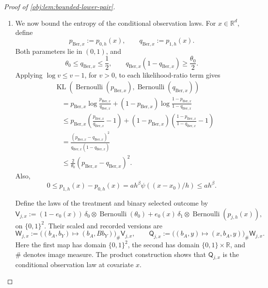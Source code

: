 \documentclass[11pt]{article}
\begin{document}
\begin{proof}[Proof of \cref{obj:lem:bounded-lower-pair}]
\begin{enumerate}
\item We now bound the entropy of the conditional observation laws.
For \(x\in\mathbb R^d\), define
\[
p_{\mathrm{Ber},x}:=p_{0,h}(x),
\qquad
q_{\mathrm{Ber},x}:=p_{1,h}(x).
\]
Both parameters lie in \((0,1)\), and
\[
\theta_0\le q_{\mathrm{Ber},x}\le\frac12,
\qquad
q_{\mathrm{Ber},x}(1-q_{\mathrm{Ber},x})
\ge\frac{\theta_0}{2}.
\]
Applying \(\log v\le v-1\), for \(v>0\), to each likelihood-ratio term gives
\[
\begin{aligned}
&\operatorname{KL}\!\left(
\operatorname{Bernoulli}(p_{\mathrm{Ber},x}),
\operatorname{Bernoulli}(q_{\mathrm{Ber},x})
\right)\\
&\quad=
p_{\mathrm{Ber},x}\log\frac{p_{\mathrm{Ber},x}}{q_{\mathrm{Ber},x}}
+(1-p_{\mathrm{Ber},x})
 \log\frac{1-p_{\mathrm{Ber},x}}{1-q_{\mathrm{Ber},x}}\\
&\quad\le
p_{\mathrm{Ber},x}
 \left(\frac{p_{\mathrm{Ber},x}}{q_{\mathrm{Ber},x}}-1\right)
+(1-p_{\mathrm{Ber},x})
 \left(\frac{1-p_{\mathrm{Ber},x}}{1-q_{\mathrm{Ber},x}}-1\right)\\
&\quad=
\frac{(p_{\mathrm{Ber},x}-q_{\mathrm{Ber},x})^2}
     {q_{\mathrm{Ber},x}(1-q_{\mathrm{Ber},x})}\\
&\quad\le
\frac{2}{\theta_0}(p_{\mathrm{Ber},x}-q_{\mathrm{Ber},x})^2.
\end{aligned}
\]
Also,
\[
0\le p_{1,h}(x)-p_{0,h}(x)
=ah^\beta\psi((x-x_0)/h)
\le ah^\beta.
\]

Define the laws of the treatment and binary selected outcome by
\[
\mathsf V_{j,x}:=
(1-e_0(x))\,\delta_0\otimes\operatorname{Bernoulli}(\theta_0)
+
e_0(x)\,\delta_1\otimes\operatorname{Bernoulli}(p_{j,h}(x)),
\]
on \(\{0,1\}^2\). Their scaled and recorded versions are
\[
\mathsf W_{j,x}
:=
\bigl((b_A,b_Y)\mapsto(b_A,Bb_Y)\bigr)_\#\mathsf V_{j,x},
\qquad
\mathsf Q_{j,x}
:=
\bigl((b_A,y)\mapsto(x,b_A,y)\bigr)_\#\mathsf W_{j,x}.
\]
Here the first map has domain \(\{0,1\}^2\), the second has domain
\(\{0,1\}\times\mathbb R\), and \(\#\) denotes image measure.
The product construction shows that \(\mathsf Q_{j,x}\) is the
conditional observation law at covariate \(x\).


\end{enumerate}
\end{proof}
\end{document}
